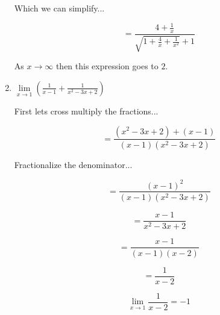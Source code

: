 \documentclass{article}
\begin{document}
\begin{enumerate}
			Which we can simplify...

			$$ = \frac{ 4 + \frac{1}{x} }{ \sqrt{1 + \frac{4}{x} + \frac{1}{x^2}} + 1}$$

			As $x \to \infty$ then this expression goes to $2$.

		\item $\lim \limits _{x \to 1} (\frac{1}{x-1} + \frac{1}{x^2 - 3x + 2})$

			First lets cross multiply the fractions...

			$$ = \frac{ (x^2 - 3x + 2) + (x - 1)}{(x-1)(x^2 - 3x + 2)}$$

			Fractionalize the denominator...

			$$ = \frac{(x-1)^2}{(x-1)(x^2 - 3x + 2)}$$

			$$ = \frac{x-1}{x^2 - 3x + 2}$$

			$$ = \frac{x-1}{(x-1)(x-2)}$$

			$$ = \frac{1}{x-2}$$

			$$\lim \limits _{x \to 1} \frac{1}{x-2} = -1$$
		
\end{enumerate}
\end{document}
